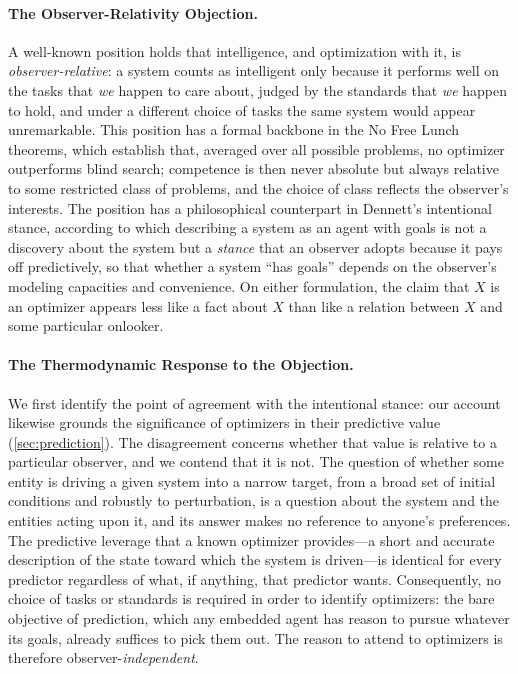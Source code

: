 \documentclass[11pt]{article}
\begin{document}
\paragraph{The Observer-Relativity Objection.} A well-known position holds that intelligence, and optimization with it, is \emph{observer-relative}: a system counts as intelligent only because it performs well on the tasks that \emph{we} happen to care about, judged by the standards that \emph{we} happen to hold, and under a different choice of tasks the same system would appear unremarkable. This position has a formal backbone in the No Free Lunch theorems, which establish that, averaged over all possible problems, no optimizer outperforms blind search; competence is then never absolute but always relative to some restricted class of problems, and the choice of class reflects the observer's interests. The position has a philosophical counterpart in Dennett's intentional stance, according to which describing a system as an agent with goals is not a discovery about the system but a \emph{stance} that an observer adopts because it pays off predictively, so that whether a system ``has goals'' depends on the observer's modeling capacities and convenience. On either formulation, the claim that $X$ is an optimizer appears less like a fact about $X$ than like a relation between $X$ and some particular onlooker.

\paragraph{The Thermodynamic Response to the Objection.} We first identify the point of agreement with the intentional stance: our account likewise grounds the significance of optimizers in their predictive value (\cref{sec:prediction}). The disagreement concerns whether that value is relative to a particular observer, and we contend that it is not. The question of whether some entity is driving a given system into a narrow target, from a broad set of initial conditions and robustly to perturbation, is a question about the system and the entities acting upon it, and its answer makes no reference to anyone's preferences. The predictive leverage that a known optimizer provides---a short and accurate description of the state toward which the system is driven---is identical for every predictor regardless of what, if anything, that predictor wants. Consequently, no choice of tasks or standards is required in order to identify optimizers: the bare objective of prediction, which any embedded agent has reason to pursue whatever its goals, already suffices to pick them out. The reason to attend to optimizers is therefore observer-\emph{independent}.
\end{document}

